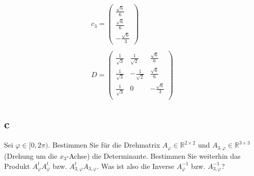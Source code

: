 \begin{align*}
    c_3 = \begin{pmatrix}
        \frac{\sqrt{6}}{6} \\ \frac{\sqrt{6}}{6} \\ -\frac{\sqrt{6}}{3}
    \end{pmatrix} \\\\D = \begin{pmatrix}
        \frac{1}{\sqrt{3}} & \frac{1}{\sqrt{2}} & \frac{\sqrt{6}}{6} \\
        \frac{1}{\sqrt{3}} & -\frac{1}{\sqrt{2}} & \frac{\sqrt{6}}{6} \\
        \frac{1}{\sqrt{3}} & 0 & -\frac{\sqrt{6}}{3} \\
    \end{pmatrix}
\end{align*}

\subsection{c}

Sei $\varphi \in [0, 2\pi)$. Bestimmen Sie für die Drehmatrix $A_\varphi \in \mathbb{R}^{2 \times 2}$ und 
$A_{3, \varphi} \in \mathbb{R}^{3 \times 3}$ (Drehung um die $x_3$-Achse) die Determinante. Bestimmen Sie 
weiterhin das Produkt $A^t_\varphi A^t_\varphi$ bzw. $A^t_{3, \varphi} A_{3, \varphi}$. Was ist also die Inverse
$A^{-1}_{\varphi}$ bzw. $A^{-1}_{3, \varphi}$?

